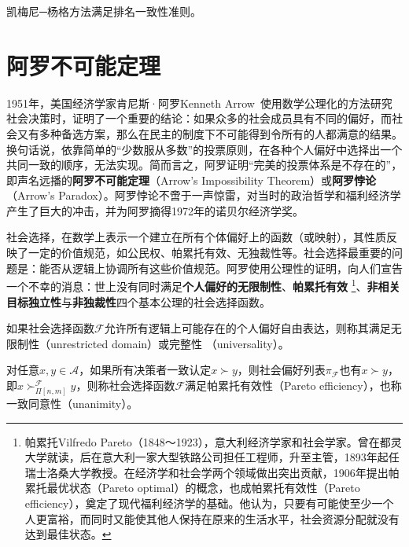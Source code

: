 \begin{corollary}
凯梅尼─杨格方法满足排名一致性准则。
\end{corollary}

\section{阿罗不可能定理}
1951年，美国经济学家肯尼斯·阿罗Kenneth Arrow~\cite{arrow1950difficulty,arrow2012social}使用数学公理化的方法研究社会决策时，证明了一个重要的结论：如果众多的社会成员具有不同的偏好，而社会又有多种备选方案，那么在民主的制度下不可能得到令所有的人都满意的结果。换句话说，依靠简单的“少数服从多数”的投票原则，在各种个人偏好中选择出一个共同一致的顺序，无法实现。简而言之，阿罗证明“完美的投票体系是不存在的”，即声名远播的\textbf{阿罗不可能定理}（Arrow's Impossibility Theorem）或\textbf{阿罗悖论}（Arrow's Paradox）。阿罗悖论不啻于一声惊雷，对当时的政治哲学和福利经济学产生了巨大的冲击，并为阿罗摘得1972年的诺贝尔经济学奖。


社会选择，在数学上表示一个建立在所有个体偏好上的函数（或映射），其性质反映了一定的价值规范，如公民权、帕累托有效、无独裁性等。社会选择最重要的问题是：能否从逻辑上协调所有这些价值规范。阿罗使用公理性的证明，向人们宣告一个不幸的消息：世上没有同时满足\textbf{个人偏好的无限制性}、\textbf{帕累托有效}
\footnote{帕累托Vilfredo Pareto（1848～1923），意大利经济学家和社会学家。曾在都灵大学就读，后在意大利一家大型铁路公司担任工程师，升至主管，1893年起任瑞士洛桑大学教授。在经济学和社会学两个领域做出突出贡献，1906年提出帕累托最优状态（Pareto optimal）的概念，也成帕累托有效性（Pareto efficiency），奠定了现代福利经济学的基础。他认为，只要有可能使至少一个人更富裕，而同时又能使其他人保持在原来的生活水平，社会资源分配就没有达到最佳状态。}、\textbf{非相关目标独立性}与\textbf{非独裁性}四个基本公理的社会选择函数。

\begin{definition}[个人偏好的无限制性]
如果社会选择函数$\mathcal F$允许所有逻辑上可能存在的个人偏好自由表达，则称其满足无限制性（unrestricted domain）或完整性
（universality）。
\end{definition}

\begin{definition}[帕累托有效性]
对任意$x,y\in \mathcal A$，如果所有决策者一致认定$x\succ y$，则社会偏好列表$\pi_\mathcal F$也有$x\succ y$，即$x\succ_{\Pi[n,m]}^{\mathcal F} y$，则称社会选择函数$\mathcal F$满足帕累托有效性（Pareto efficiency），也称一致同意性（unanimity）。
\end{definition}

